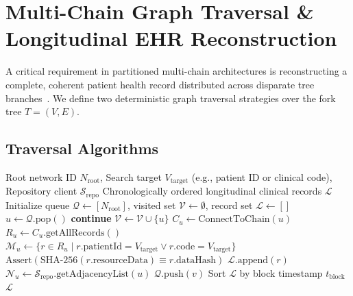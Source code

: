 \documentclass[journal]{IEEEtran}
\theoremstyle{definition}
\begin{document}
\section{Multi-Chain Graph Traversal \& Longitudinal EHR Reconstruction}
A critical requirement in partitioned multi-chain architectures is reconstructing a complete, coherent patient health record distributed across disparate tree branches~\cite{cormen2022introduction}. We define two deterministic graph traversal strategies over the fork tree $T = (V, E)$.

\subsection{Traversal Algorithms}

\begin{algorithm}[t]
\caption{Level-Order Breadth-First Search ($\text{BFS-EHR}$)}
\label{alg:bfs}
\begin{algorithmic}[1]
\Require Root network ID $N_{\text{root}}$, Search target $V_{\text{target}}$ (e.g., patient ID or clinical code), Repository client $\mathcal{S}_{\text{repo}}$
\Ensure Chronologically ordered longitudinal clinical records $\mathcal{L}$
\State Initialize queue $\mathcal{Q} \leftarrow [N_{\text{root}}]$, visited set $\mathcal{V} \leftarrow \emptyset$, record set $\mathcal{L} \leftarrow []$
    \State $u \leftarrow \mathcal{Q}.\text{pop}()$
        \State \textbf{continue}
    \EndIf
    \State $\mathcal{V} \leftarrow \mathcal{V} \cup \{u\}$
    \State $C_u \leftarrow \text{ConnectToChain}(u)$
    \State $R_u \leftarrow C_u.\text{getAllRecords}()$
    \State $\mathcal{M}_u \leftarrow \{r \in R_u \mid r.\text{patientId} = V_{\text{target}} \lor r.\text{code} = V_{\text{target}}\}$
        \State $\text{Assert}(\text{SHA-256}(r.\text{resourceData}) \equiv r.\text{dataHash})$
        \State $\mathcal{L}.\text{append}(r)$
    \EndFor
    \State $\mathcal{N}_u \leftarrow \mathcal{S}_{\text{repo}}.\text{getAdjacencyList}(u)$
        \State $\mathcal{Q}.\text{push}(v)$
    \EndFor
\EndWhile
\State Sort $\mathcal{L}$ by block timestamp $t_{\text{block}}$
\State \Return $\mathcal{L}$
\end{algorithmic}
\end{algorithm}
\end{document}
